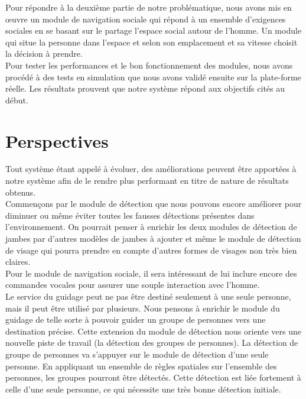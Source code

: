 \tab Pour répondre à la deuxième partie de notre problématique, nous avons mis en œuvre un module de navigation sociale qui répond à un ensemble d'exigences sociales en se basant sur le partage l'espace social autour de l'homme. Un module qui situe la personne dans l'espace et selon son emplacement et sa vitesse choisit la décision à prendre.\vspace{5px}\\
\tab Pour tester les performances et le bon fonctionnement des modules, nous avons procédé à des tests en simulation que nous avons validé ensuite sur la plate-forme réelle. Les résultats prouvent que notre système répond aux objectifs cités au début.

\section{Perspectives}

\tab Tout système étant appelé à évoluer, des améliorations peuvent être apportées à notre système afin de le rendre plus performant en titre de nature de résultats obtenus.\vspace{5px}\\
\tab Commençons par le module de détection que nous pouvons encore améliorer pour diminuer ou même éviter toutes les fausses détections présentes dans l'environnement. On pourrait penser à enrichir les deux modules de détection de jambes par d'autres modèles de jambes à ajouter et même le module de détection de visage qui pourra prendre en compte d'autres formes de visages non très bien claires.\vspace{5px}\\
\tab Pour le module de navigation sociale, il sera intéressant de lui inclure encore des commandes vocales pour assurer une souple interaction avec l'homme.\vspace{5px}\\
\tab Le service du guidage peut ne pas être destiné seulement à une seule personne, mais il peut être utilisé par plusieurs. Nous pensons à enrichir le module du guidage de telle sorte à pouvoir guider un groupe de personnes vers une destination précise. Cette extension du module de détection nous oriente vers une nouvelle piste de travail (la détection des groupes de personnes). La détection de groupe de personnes va s'appuyer sur le module de détection d'une seule personne. En appliquant un ensemble de règles spatiales sur l'ensemble des personnes, les groupes pourront être détectés. Cette détection est liée fortement à celle d'une seule personne, ce qui nécessite une très bonne détection initiale.


